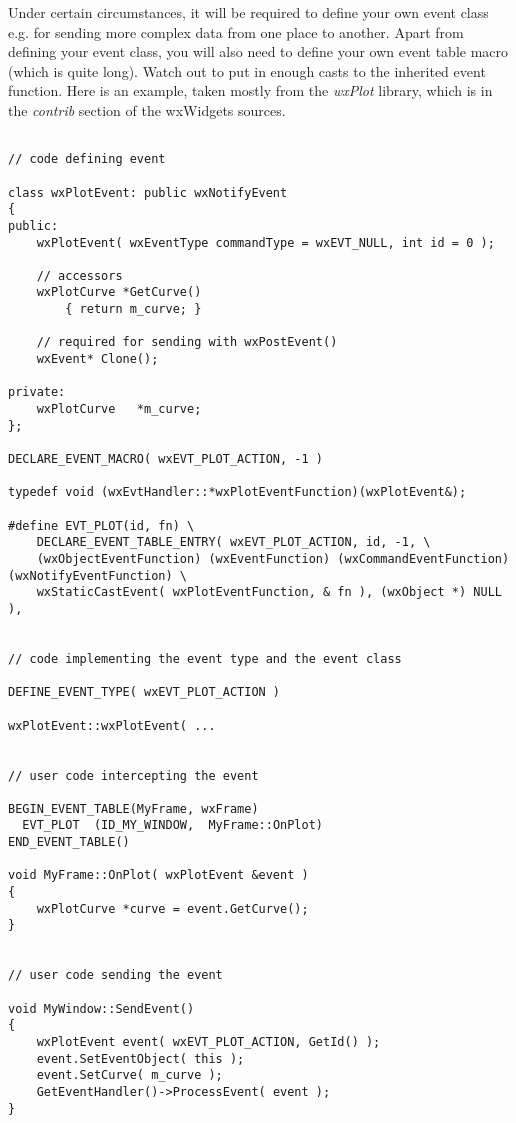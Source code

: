 
Under certain circumstances, it will be required to define your own event
class e.g. for sending more complex data from one place to another. Apart
from defining your event class, you will also need to define your own
event table macro (which is quite long). Watch out to put in enough
casts to the inherited event function. Here is an example, taken mostly
from the {\it wxPlot} library, which is in the {\it contrib} section of
the wxWidgets sources.

{\small%
\begin{verbatim}

// code defining event

class wxPlotEvent: public wxNotifyEvent
{
public:
    wxPlotEvent( wxEventType commandType = wxEVT_NULL, int id = 0 );

    // accessors
    wxPlotCurve *GetCurve()
        { return m_curve; }

    // required for sending with wxPostEvent()
    wxEvent* Clone();

private:
    wxPlotCurve   *m_curve;
};

DECLARE_EVENT_MACRO( wxEVT_PLOT_ACTION, -1 )

typedef void (wxEvtHandler::*wxPlotEventFunction)(wxPlotEvent&);

#define EVT_PLOT(id, fn) \
    DECLARE_EVENT_TABLE_ENTRY( wxEVT_PLOT_ACTION, id, -1, \
    (wxObjectEventFunction) (wxEventFunction) (wxCommandEventFunction) (wxNotifyEventFunction) \
    wxStaticCastEvent( wxPlotEventFunction, & fn ), (wxObject *) NULL ),


// code implementing the event type and the event class

DEFINE_EVENT_TYPE( wxEVT_PLOT_ACTION )

wxPlotEvent::wxPlotEvent( ...


// user code intercepting the event

BEGIN_EVENT_TABLE(MyFrame, wxFrame)
  EVT_PLOT  (ID_MY_WINDOW,  MyFrame::OnPlot)
END_EVENT_TABLE()

void MyFrame::OnPlot( wxPlotEvent &event )
{
    wxPlotCurve *curve = event.GetCurve();
}


// user code sending the event

void MyWindow::SendEvent()
{
    wxPlotEvent event( wxEVT_PLOT_ACTION, GetId() );
    event.SetEventObject( this );
    event.SetCurve( m_curve );
    GetEventHandler()->ProcessEvent( event );
}

\end{verbatim}
}%

